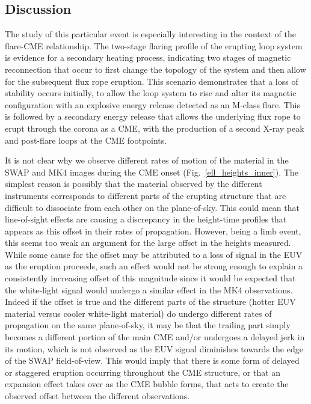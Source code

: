 \documentclass[namedreferences]{solarphysics}
\begin{document}
\begin{article}
\section{Discussion}
\label{sect:discussion}

The study of this particular event is especially interesting in the context of the flare-CME relationship. The two-stage flaring profile of the erupting loop system is evidence for a secondary heating process, indicating two stages of magnetic reconnection that occur to first change the topology of the system and then allow for the subsequent flux rope eruption. This scenario demonstrates that a loss of stability occurs initially, to allow the loop system to rise and alter its magnetic configuration with an explosive energy release detected as an M-class flare. This is followed by a secondary energy release that allows the underlying flux rope to erupt through the corona as a CME, with the production of a second X-ray peak and post-flare loops at the CME footpoints.

It is not clear why we observe different rates of motion of the material in the SWAP and MK4 images during the CME onset (Fig.~\ref{ell_heights_inner}). The simplest reason is possibly that the material observed by the different instruments corresponds to different parts of the erupting structure that are difficult to dissociate from each other on the plane-of-sky. This could mean that line-of-sight effects are causing a discrepancy in the height-time profiles that appears as this offset in their rates of propagation. However, being a limb event, this seems too weak an argument for the large offset in the heights measured. While some cause for the offset may be attributed to a loss of signal in the EUV as the eruption proceeds, such an effect would not be strong enough to explain a consistently increasing offset of this magnitude since it would be expected that the white-light signal would undergo a similar effect in the MK4 observations. Indeed if the offset is true and the different parts of the structure (hotter EUV material versus cooler white-light material) do undergo different rates of propagation on the same plane-of-sky, it may be that the trailing part simply becomes a different portion of the main CME and/or undergoes a delayed jerk in its motion, which is not observed as the EUV signal diminishes towards the edge of the SWAP field-of-view. This would imply that there is some form of delayed or staggered eruption occurring throughout the CME structure, or that an expansion effect takes over as the CME bubble forms, that acts to create the observed offset between the different observations. 


\end{article}
\end{document}

